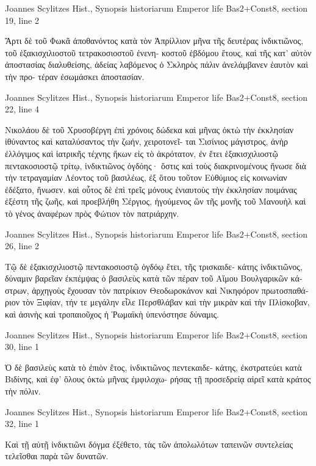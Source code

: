 \documentclass[12pt,letterpaper,twoside,final]{memoir}
\begin{document}
\begin{greek}
Joannes Scylitzes Hist., Synopsis historiarum 
Emperor life Bas2+Const8, section 19, line 2

Ἄρτι δὲ τοῦ Φωκᾶ ἀποθανόντος κατὰ τὸν Ἀπρίλλιον μῆνα 
τῆς δευτέρας ἰνδικτιῶνος, τοῦ ἑξακισχιλιοστοῦ τετρακοσιοστοῦ ἐνενη-
κοστοῦ ἑβδόμου ἔτους, καὶ τῆς κατ' αὐτὸν ἀποστασίας διαλυθείσης, 
ἀδείας λαβόμενος ὁ Σκληρὸς πάλιν ἀνελάμβανεν ἑαυτὸν καὶ τὴν προ-
τέραν ἐσωμάσκει ἀποστασίαν. 



Joannes Scylitzes Hist., Synopsis historiarum 
Emperor life Bas2+Const8, section 22, line 4

Νικολάου δὲ τοῦ Χρυσοβέργη ἐπὶ χρόνοις δώδεκα καὶ μῆνας 
ὀκτὼ τὴν ἐκκλησίαν ἰθύναντος καὶ καταλύσαντος τὴν ζωήν, χειροτονεῖ-
ται Σισίνιος μάγιστρος, ἀνὴρ ἐλλόγιμος καὶ ἰατρικῆς τέχνης ἥκων εἰς τὸ 
ἀκρότατον, ἐν ἔτει ἑξακισχιλιοστῷ πεντακοσιοστῷ τρίτῳ, ἰνδικτιῶνος   
ὀγδόης· ὅστις καὶ τοὺς διακρινομένους ἥνωσε διὰ τὴν τετραγαμίαν 
Λέοντος τοῦ βασιλέως, ἐξ ὅτου τοῦτον Εὐθύμιος εἰς κοινωνίαν ἐδέξατο, ἥνωσεν. 
καὶ οὗτος δὲ ἐπὶ τρεῖς μόνους ἐνιαυτοὺς τὴν ἐκκλησίαν ποιμάνας ἐξέστη 
τῆς ζωῆς, καὶ προεβλήθη Σέργιος, ἡγούμενος ὢν τῆς μονῆς τοῦ Μανουὴλ 
καὶ τὸ γένος ἀναφέρων πρὸς Φώτιον τὸν πατριάρχην. 



Joannes Scylitzes Hist., Synopsis historiarum 
Emperor life Bas2+Const8, section 26, line 2

Τῷ δὲ ἑξακισχιλιοστῷ πεντακοσιοστῷ ὀγδόῳ ἔτει, τῆς τρισκαιδε-
κάτης ἰνδικτιῶνος, δύναμιν βαρεῖαν ἐκπέμψας ὁ βασιλεὺς κατὰ τῶν πέραν 
τοῦ Αἵμου Βουλγαρικῶν κάστρων, ἀρχηγοὺς ἔχουσαν τὸν πατρίκιον 
Θεοδωροκάνον καὶ Νικηφόρον πρωτοσπαθάριον τὸν Ξιφίαν, τήν τε   
μεγάλην εἷλε Περσθλάβαν καὶ τὴν μικρὰν καὶ τὴν Πλίσκοβαν, καὶ ἀσινὴς 
καὶ τροπαιοῦχος ἡ Ῥωμαϊκὴ ὑπενόστησε δύναμις. 



Joannes Scylitzes Hist., Synopsis historiarum 
Emperor life Bas2+Const8, section 30, line 1

Ὁ δὲ βασιλεὺς κατὰ τὸ ἐπιὸν ἔτος, ἰνδικτιῶνος πεντεκαιδε-
κάτης, ἐκστρατεύει κατὰ Βιδίνης, καὶ ἐφ' ὅλους ὀκτὼ μῆνας ἐμφιλοχω-
ρήσας τῇ προσεδρείᾳ αἱρεῖ κατὰ κράτος τὴν πόλιν. 



Joannes Scylitzes Hist., Synopsis historiarum 
Emperor life Bas2+Const8, section 32, line 1

Καὶ τῇ αὐτῇ ἰνδικτιῶνι δόγμα ἐξέθετο, τὰς τῶν ἀπολωλότων 
ταπεινῶν συντελείας τελεῖσθαι παρὰ τῶν δυνατῶν. 




\end{greek}
\end{document}
